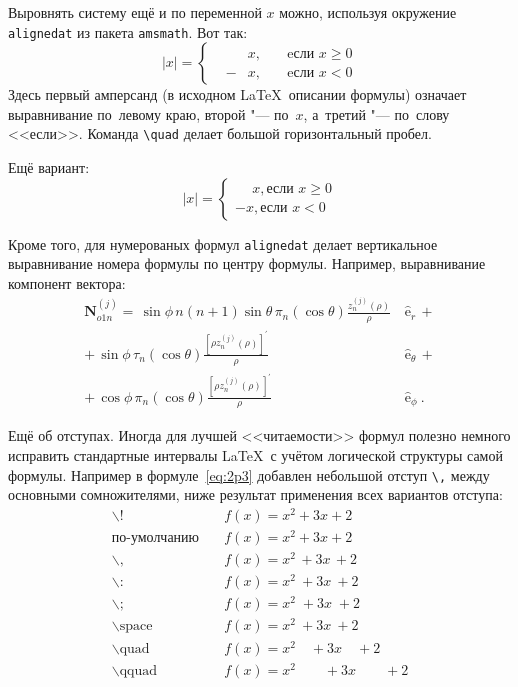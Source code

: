 Выровнять систему ещё и по переменной $ x $ можно, используя окружение
\verb|alignedat| из пакета \verb|amsmath|. Вот так:
\[
    |x| = \left\{
    \begin{alignedat}{2}
        &&x, \quad &\text{eсли } x\geqslant 0 \\
        &-&x, \quad & \text{eсли } x<0
    \end{alignedat}
    \right.
\]
Здесь первый амперсанд (в исходном \LaTeX\ описании формулы) означает
выравнивание по~левому краю, второй "--- по~$ x $, а~третий "--- по~слову
<<если>>. Команда \verb|\quad| делает большой горизонтальный пробел.

Ещё вариант:
\[
    |x|=
    \begin{cases}
    \phantom{-}x, \text{если } x \geqslant 0 \\
    -x, \text{если } x<0
    \end{cases}
\]

Кроме того, для  нумерованых формул \verb|alignedat| делает вертикальное
выравнивание номера формулы по центру формулы. Например, выравнивание
компонент вектора:
\begin{equation}
 \label{eq:2p3}
 \begin{alignedat}{2}
{\mathbf{N}}_{o1n}^{(j)} = \,{\sin} \phi\,n\!\left(n+1\right)
         {\sin}\theta\,
         \pi_n\!\left({\cos} \theta\right)
         \frac{
               z_n^{(j)}\!\left( \rho \right)
              }{\rho}\,
           &{\boldsymbol{\hat{\mathrm e}}}_{r}\,+   \\
+\,
{\sin} \phi\,
         \tau_n\!\left({\cos} \theta\right)
         \frac{
            \left[\rho z_n^{(j)}\!\left( \rho \right)\right]^{\prime}
              }{\rho}\,
            &{\boldsymbol{\hat{\mathrm e}}}_{\theta}\,+   \\
+\,
{\cos} \phi\,
         \pi_n\!\left({\cos} \theta\right)
         \frac{
            \left[\rho z_n^{(j)}\!\left( \rho \right)\right]^{\prime}
              }{\rho}\,
            &{\boldsymbol{\hat{\mathrm e}}}_{\phi}\:.
\end{alignedat}
\end{equation}

Ещё об отступах. Иногда для лучшей <<читаемости>> формул полезно
немного исправить стандартные интервалы \LaTeX\ с учётом логической
структуры самой формулы. Например в формуле~\ref{eq:2p3} добавлен
небольшой отступ \verb+\,+ между основными сомножителями, ниже
результат применения всех вариантов отступа:
\begin{align*}
\backslash! &\quad f(x) = x^2\! +3x\! +2 \\
  \mbox{по-умолчанию} &\quad f(x) = x^2+3x+2 \\
\backslash, &\quad f(x) = x^2\, +3x\, +2 \\
\backslash{:} &\quad f(x) = x^2\: +3x\: +2 \\
\backslash; &\quad f(x) = x^2\; +3x\; +2 \\
\backslash \mbox{space} &\quad f(x) = x^2\ +3x\ +2 \\
\backslash \mbox{quad} &\quad f(x) = x^2\quad +3x\quad +2 \\
\backslash \mbox{qquad} &\quad f(x) = x^2\qquad +3x\qquad +2
\end{align*}

